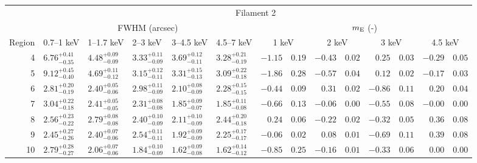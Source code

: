 \begin{tabular}{@{}rlllllr@{ $\pm$ }lr@{ $\pm$ }lr@{ $\pm$ }lr@{ $\pm$ }l@{}}
\midrule
{} & \multicolumn{13}{c}{Filament 2} \\
\cmidrule(l){2-14}
{} & \multicolumn{5}{c}{FWHM (arcsec)} & \multicolumn{8}{c}{$m_\mathrm{E}$ (-)} \\
\cmidrule(lr){2-6} \cmidrule(l){7-14}
Region & 0.7--1 keV & 1--1.7 keV & 2--3 keV & 3--4.5 keV & 4.5--7 keV
       & \multicolumn{2}{c}{1 keV} & \multicolumn{2}{c}{2 keV}
       & \multicolumn{2}{c}{3 keV} & \multicolumn{2}{c}{4.5 keV} \\
\cmidrule{1-14}
4 & ${6.76}^{+0.41}_{-0.35}$ & ${4.48}^{+0.09}_{-0.09}$ & ${3.33}^{+0.11}_{-0.09}$ & ${3.69}^{+0.12}_{-0.11}$ & ${3.28}^{+0.21}_{-0.19}$
  & $-1.15$ & $0.19$ & $-0.43$ & $0.02$ & $0.25$ & $0.03$ & $-0.29$ & $0.05$ \\
5 & ${9.12}^{+0.45}_{-0.40}$ & ${4.69}^{+0.11}_{-0.12}$ & ${3.15}^{+0.12}_{-0.11}$ & ${3.31}^{+0.15}_{-0.13}$ & ${3.09}^{+0.22}_{-0.18}$
  & $-1.86$ & $0.28$ & $-0.57$ & $0.04$ & $0.12$ & $0.02$ & $-0.17$ & $0.03$ \\
6 & ${2.81}^{+0.20}_{-0.19}$ & ${2.40}^{+0.05}_{-0.06}$ & ${2.98}^{+0.11}_{-0.09}$ & ${2.10}^{+0.08}_{-0.09}$ & ${2.28}^{+0.15}_{-0.15}$
  & $-0.44$ & $0.09$ & $0.31$ & $0.02$ & $-0.86$ & $0.11$ & $0.20$ & $0.04$ \\
7 & ${3.04}^{+0.22}_{-0.18}$ & ${2.41}^{+0.05}_{-0.05}$ & ${2.31}^{+0.08}_{-0.08}$ & ${1.85}^{+0.09}_{-0.07}$ & ${1.85}^{+0.11}_{-0.08}$
  & $-0.66$ & $0.13$ & $-0.06$ & $0.00$ & $-0.55$ & $0.08$ & $-0.00$ & $0.00$ \\
8 & ${2.56}^{+0.23}_{-0.22}$ & ${2.79}^{+0.08}_{-0.08}$ & ${2.40}^{+0.10}_{-0.09}$ & ${2.11}^{+0.10}_{-0.09}$ & ${2.44}^{+0.20}_{-0.18}$
  & $0.24$ & $0.06$ & $-0.22$ & $0.02$ & $-0.32$ & $0.05$ & $0.36$ & $0.08$ \\
9 & ${2.45}^{+0.27}_{-0.26}$ & ${2.40}^{+0.07}_{-0.06}$ & ${2.54}^{+0.11}_{-0.11}$ & ${1.92}^{+0.09}_{-0.09}$ & ${2.25}^{+0.17}_{-0.17}$
  & $-0.06$ & $0.02$ & $0.08$ & $0.01$ & $-0.69$ & $0.11$ & $0.39$ & $0.08$ \\
10 & ${2.79}^{+0.28}_{-0.27}$ & ${2.06}^{+0.07}_{-0.06}$ & ${1.84}^{+0.10}_{-0.09}$ & ${1.62}^{+0.09}_{-0.08}$ & ${1.62}^{+0.14}_{-0.12}$
  & $-0.85$ & $0.25$ & $-0.16$ & $0.01$ & $-0.33$ & $0.06$ & $0.00$ & $0.00$ \\


\end{tabular}

